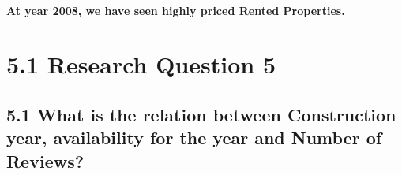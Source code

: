\documentclass[11pt]{article}
\begin{document}
    \begin{center}
    \end{center}
    { \hspace*{\fill} \\}
    
    \textbf{At year 2008, we have seen highly priced Rented Properties.}

    \hypertarget{research-question-5}{%
\section{5.1 Research Question 5}\label{research-question-5}}

\hypertarget{what-is-the-relation-between-construction-year-availability-for-the-year-and-number-of-reviews}{%
\subsection{5.1 What is the relation between Construction year,
availability for the year and Number of
Reviews?}\label{what-is-the-relation-between-construction-year-availability-for-the-year-and-number-of-reviews}}
\end{document}
